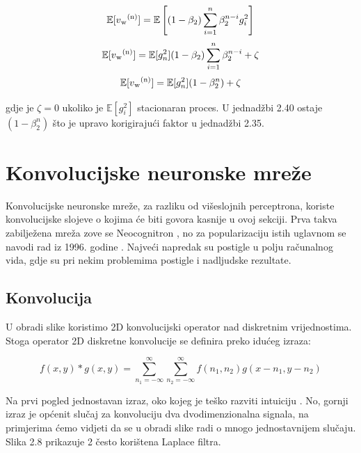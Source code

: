 \documentclass[times, utf8, diplomski]{fer}
\begin{document}
\begin{equation}
\mathbb{E}[v\textsubscript{w}\textsuperscript{(n)}] = \mathbb{E}\left[(1 - \beta_2)\sum_{i=1}^n \beta_2^{n-i}g_i^2\right]
\end{equation}
\begin{equation}
\mathbb{E}[v\textsubscript{w}\textsuperscript{(n)}] = \mathbb{E}[g_n^2](1 - \beta_2)\sum_{i=1}^n \beta_2^{n-i} + \zeta
\end{equation}
\begin{equation}
\mathbb{E}[v\textsubscript{w}\textsuperscript{(n)}] = \mathbb{E}[g_n^2](1 - \beta_2^n) + \zeta
\end{equation}

gdje je $\zeta = 0$ ukoliko je $\mathbb{E}[g_i^2]$ stacionaran proces. U jednadžbi 2.40 ostaje $(1 - \beta_2^n)$ što je upravo korigirajući faktor u jednadžbi 2.35.

\pagebreak

\section{Konvolucijske neuronske mreže}
Konvolucijske neuronske mreže, za razliku od višeslojnih perceptrona, koriste konvolucijske slojeve o kojima će biti govora kasnije u ovoj sekciji. Prva takva zabilježena mreža zove se Neocognitron \cite{neocognitron}, no za popularizaciju istih uglavnom se navodi rad iz 1996. godine \cite{convnet}. Najveći napredak su postigle u polju računalnog vida, gdje su pri nekim problemima postigle i nadljudske rezultate. 

\subsection{Konvolucija}
U obradi slike koristimo 2D konvolucijski operator nad diskretnim vrijednostima. Stoga operator 2D diskretne konvolucije se definira preko idućeg izraza:

\begin{equation}
f(x,y) * g(x,y) = \sum_{n_1 = -\infty}^\infty \sum_{n_2 = -\infty}^\infty f(n_1, n_2) g(x - n_1, y - n_2)
\end{equation}

Na prvi pogled jednostavan izraz, oko kojeg je teško razviti intuiciju \cite{convolution}. No, gornji izraz je općenit slučaj za konvoluciju dva dvodimenzionalna signala, na primjerima ćemo vidjeti da se u obradi slike radi o mnogo jednostavnijem slučaju. Slika 2.8 prikazuje 2 često korištena Laplace filtra.\par
\end{document}
